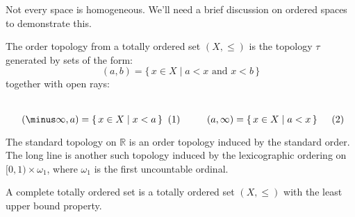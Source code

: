 \documentclass[oneside]{book}                                                  %
\begin{document}
            Not every space is homogeneous. We'll need a brief discussion on
            ordered spaces to demonstrate this.
            \begin{definition}
                The order topology from a totally ordered set $(X,\leq)$ is
                the topology $\tau$ generated by sets of the form:
                \begin{equation}
                    (a,b)=\{\,x\in{X}\;|\;a<x\textrm{ and }x<b\,\}
                \end{equation}
                together with open rays:
                \par
                \begin{subequations}
                    \begin{minipage}[b]{0.49\textwidth}
                        \centering
                        \begin{equation}
                            (\minus\infty,a)=\{\,x\in{X}\;|\;x<a\,\}
                        \end{equation}
                    \end{minipage}
                    \hfill
                    \begin{minipage}[b]{0.49\textwidth}
                        \centering
                        \begin{equation}
                            (a,\infty)=\{\,x\in{X}\;|\;a<x\,\}
                        \end{equation}
                    \end{minipage}
                \end{subequations}
                \par\vspace{2.5ex}
            \end{definition}
            \begin{example}
                The standard topology on $\mathbb{R}$ is an order topology
                induced by the standard order. The long line is another such
                topology induced by the lexicographic ordering on
                $[0,1)\times\omega_{1}$, where $\omega_{1}$ is the first
                uncountable ordinal.
            \end{example}
            \begin{definition}
                A complete totally ordered set is a totally ordered set
                $(X,\leq)$ with the least upper bound property.
            \end{definition}
\end{document}
